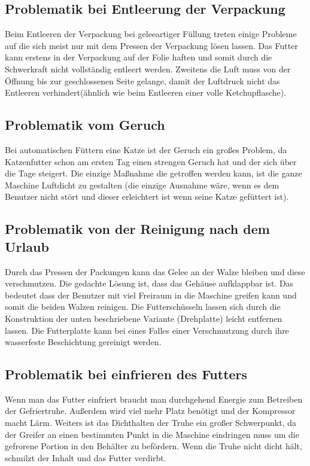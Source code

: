 \subsection{Problematik bei Entleerung der Verpackung}

Beim Entleeren der Verpackung bei geleeartiger Füllung treten einige Probleme auf die sich meist nur mit dem Pressen der Verpackung lösen lassen. Das Futter kann erstens in der Verpackung auf der Folie haften und somit durch die Schwerkraft nicht vollständig entleert werden. Zweitens die Luft muss von der Öffnung bis zur geschlossenen Seite gelange, damit der Luftdruck nicht das Entleeren verhindert(ähnlich wie beim Entleeren einer volle Ketchupflasche). 

\subsection{Problematik vom Geruch}

Bei automatischen Füttern eine Katze ist der Geruch ein großes Problem, da Katzenfutter schon am ersten Tag einen strengen Geruch hat und der sich über die Tage steigert. Die einzige Maßnahme die getroffen werden kann, ist die ganze Maschine Luftdicht zu gestalten (die einzige Ausnahme wäre, wenn es dem Benutzer nicht stört und dieser erleichtert ist wenn seine Katze gefüttert ist). 

\subsection{Problematik von der Reinigung nach dem Urlaub}

Durch das Pressen der Packungen kann das Gelee an der Walze bleiben und diese verschmutzen. Die gedachte Lösung ist, dass das Gehäuse aufklappbar ist. Das bedeutet dass der Benutzer mit viel Freiraum in die Maschine greifen kann und  somit die beiden Walzen reinigen. Die Futterschüsseln lassen sich durch die Konstruktion der unten beschriebene Variante (Drehplatte) leicht entfernen lassen. Die Futterplatte kann bei eines Falles einer Verschmutzung durch ihre wasserfeste Beschichtung gereinigt werden.

\subsection{Problematik bei einfrieren des Futters}

Wenn man das Futter einfriert braucht man durchgehend Energie zum Betreiben der Gefriertruhe. Außerdem wird viel mehr Platz benötigt und der Kompressor macht Lärm. Weiters ist das Dichthalten der Truhe ein großer Schwerpunkt, da der Greifer an einen bestimmten Punkt in die Maschine eindringen muss um die gefrorene Portion in den Behälter zu befördern. Wenn die Truhe nicht dicht hält, schmilzt der Inhalt und das Futter verdirbt.

